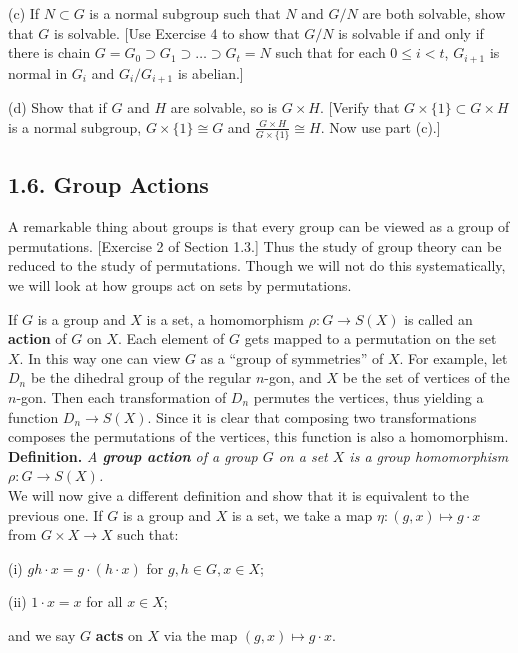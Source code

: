 \documentclass[leqno]{book}
\begin{document}
\begin{enumerate}
(c) If $N\subset G$ is a normal subgroup such that $N$ and $G/N$ are both solvable, show that $G$ is solvable.  [Use Exercise 4 to show that $G/N$ is solvable if and only if there is chain $G=G_0\supset G_1\supset\dots\supset G_t=N$ such that for each $0\leqslant i<t$, $G_{i+1}$ is normal in $G_i$ and $G_i/G_{i+1}$ is abelian.]

(d) Show that if $G$ and $H$ are solvable, so is $G\times H$.  [Verify that $G\times\{1\}\subset G\times H$ is a normal subgroup, $G\times\{1\}\cong G$ and $\frac{G\times H}{G\times\{1\}}\cong H$.  Now use part (c).]
\end{enumerate}

\subsection*{1.6. Group Actions}
A remarkable thing about groups is that every group can be viewed as a group of permutations.  [Exercise 2 of Section 1.3.]  Thus the study of group theory can be reduced to the study of permutations.  Though we will not do this systematically, we will look at how groups act on sets by permutations.

If $G$ is a group and $X$ is a set, a homomorphism $\rho:G\to S(X)$ is called an \textbf{action} of $G$ on $X$.  Each element of $G$ gets mapped to a permutation on the set $X$.  In this way one can view $G$ as a ``group of symmetries'' of $X$.  For example, let $D_n$ be the dihedral group of the regular $n$-gon, and $X$ be the set of vertices of the $n$-gon.  Then each transformation of $D_n$ permutes the vertices, thus yielding a function $D_n\to S(X)$.  Since it is clear that composing two transformations composes the permutations of the vertices, this function is also a homomorphism.\\

\noindent\textbf{Definition.} \emph{A \textbf{group action} of a group $G$ on a set $X$ is a group homomorphism $\rho:G\to S(X)$.}\\

\noindent We will now give a different definition and show that it is equivalent to the previous one.  If $G$ is a group and $X$ is a set, we take a map $\eta:(g,x)\mapsto g\cdot x$ from $G\times X\to X$ such that:

(i) $gh\cdot x=g\cdot(h\cdot x)$ for $g,h\in G,x\in X$;

(ii) $1\cdot x=x$ for all $x\in X$;

and we say $G$ \textbf{acts} on $X$ via the map $(g,x)\mapsto g\cdot x$.\\
\end{document}
